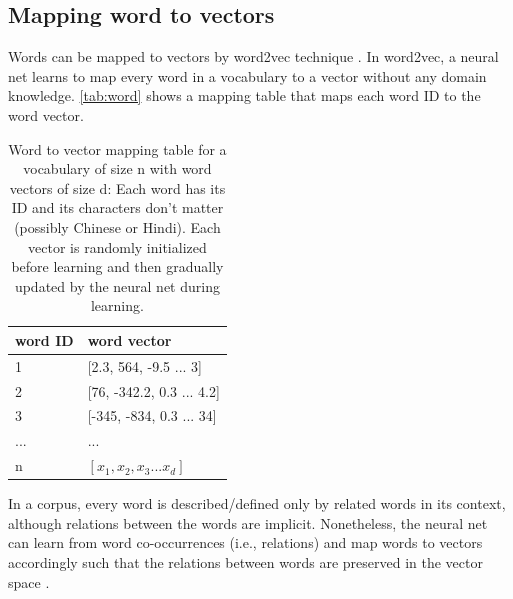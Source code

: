 \documentclass{article}
\begin{document}
\subsection{Mapping word to vectors}
Words can be mapped to vectors by word2vec technique 
\cite{mikolov2013efficient}.
In word2vec, a neural net learns to map every word in a vocabulary to a vector 
without any domain knowledge.
\autoref{tab:word} shows a mapping table that maps each word ID to the word 
vector.
\begin{table}[h]
	\centering
	\begin{tabularx}{0.5\textwidth}{|X|X|} \hline
		word ID & word vector \\ \hline
		1 & [2.3, 564, -9.5 ... 3] \\ \hline
		2 & [76, -342.2, 0.3 ... 4.2] \\ \hline
		3 & [-345, -834, 0.3 ... 34] \\ \hline
		... & ... \\ \hline
		n & $ [x_1, x_2, x_3 ... x_d] $ \\ \hline
	\end{tabularx}
	\caption{Word to vector mapping table for a vocabulary of size n with word 
	vectors of size d:
	Each word has its ID and its characters don't matter (possibly Chinese or 
	Hindi).
	Each vector is randomly initialized before learning and then gradually 
	updated by the neural net during learning.}
	\label{tab:word}
\end{table}
In a corpus, every word is described/defined only by related words in its 
context, although relations between the words are implicit. 
Nonetheless, the neural net can learn from word co-occurrences (i.e., 
relations) and map words to vectors accordingly such that the relations between 
words are preserved in the vector space \cite{mikolov2013distributed}.
\end{document}
